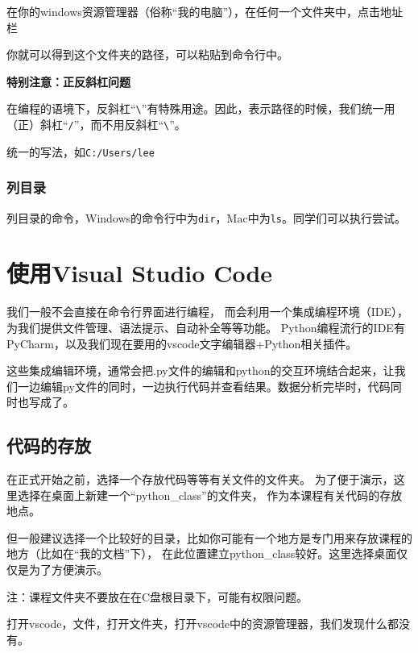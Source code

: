 \documentclass[
  letterpaper,
  DIV=11,
  numbers=noendperiod]{scrreprt}
\begin{document}
在你的windows资源管理器（俗称``我的电脑''），在任何一个文件夹中，点击地址栏

你就可以得到这个文件夹的路径，可以粘贴到命令行中。

{\textbf{特别注意：正反斜杠问题}}

在编程的语境下，反斜杠``\texttt{\textbackslash{}}''有特殊用途。因此，表示路径的时候，我们统一用（正）斜杠``\texttt{/}''，而不用反斜杠``\texttt{\textbackslash{}}''。

统一的写法，如\texttt{C:/Users/lee}

\hypertarget{ux5217ux76eeux5f55}{%
\subsection{列目录}\label{ux5217ux76eeux5f55}}

列目录的命令，Windows的命令行中为\texttt{dir}，Mac中为\texttt{ls}。同学们可以执行尝试。

\hypertarget{ux4f7fux7528visual-studio-code}{%
\chapter{使用Visual Studio Code}\label{ux4f7fux7528visual-studio-code}}

我们一般不会直接在命令行界面进行编程， 而会利用一个集成编程环境（IDE），
为我们提供文件管理、语法提示、自动补全等等功能。
Python编程流行的IDE有PyCharm，以及我们现在要用的vscode文字编辑器+Python相关插件。

这些集成编辑环境，通常会把.py文件的编辑和python的交互环境结合起来，让我们一边编辑py文件的同时，一边执行代码并查看结果。数据分析完毕时，代码同时也写成了。

\hypertarget{ux4ee3ux7801ux7684ux5b58ux653e}{%
\section{代码的存放}\label{ux4ee3ux7801ux7684ux5b58ux653e}}

在正式开始之前，选择一个存放代码等等有关文件的文件夹。
为了便于演示，这里选择在桌面上新建一个``python\_class''的文件夹，
作为本课程有关代码的存放地点。

但一般建议选择一个比较好的目录，比如你可能有一个地方是专门用来存放课程的地方（比如在``我的文档''下），
在此位置建立python\_class较好。这里选择桌面仅仅是为了方便演示。

注：课程文件夹不要放在在C盘根目录下，可能有权限问题。

打开vscode，文件，打开文件夹，打开vscode中的资源管理器，我们发现什么都没有。
\end{document}
